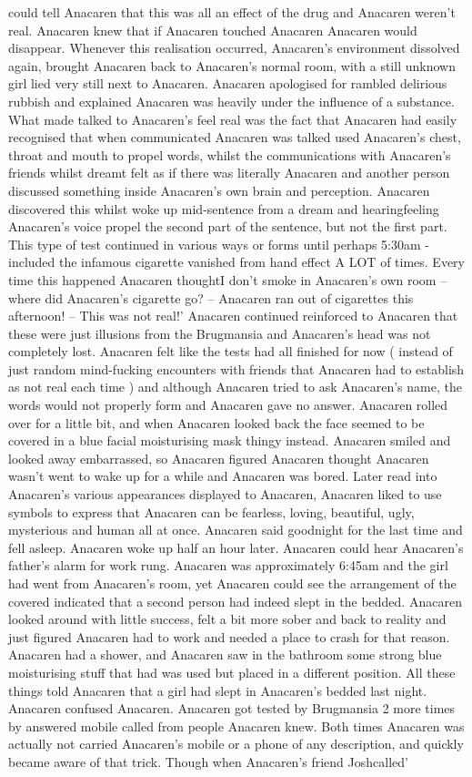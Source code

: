 \documentclass[12pt]{book}
\begin{document}
could tell Anacaren that this was all an effect of the drug and Anacaren weren't real. Anacaren knew that if Anacaren touched Anacaren Anacaren would disappear. Whenever this realisation occurred, Anacaren's environment dissolved again, brought Anacaren back to Anacaren's normal room, with a still unknown girl lied very still next to Anacaren. Anacaren apologised for rambled delirious rubbish and explained Anacaren was heavily under the influence of a substance. What made talked to Anacaren's feel real was the fact that Anacaren had easily recognised that when communicated Anacaren was talked used Anacaren's chest, throat and mouth to propel words, whilst the communications with Anacaren's friends whilst dreamt felt as if there was literally Anacaren and another person discussed something inside Anacaren's own brain and perception. Anacaren discovered this whilst woke up mid-sentence from a dream and hearingfeeling Anacaren's voice propel the second part of the sentence, but not the first part. This type of test continued in various ways or forms until perhaps 5:30am - included the infamous cigarette vanished from hand effect A LOT of times. Every time this happened Anacaren thoughtI don't smoke in Anacaren's own room -- where did Anacaren's cigarette go? -- Anacaren ran out of cigarettes this afternoon! -- This was not real!' Anacaren continued reinforced to Anacaren that these were just illusions from the Brugmansia and Anacaren's head was not completely lost. Anacaren felt like the tests had all finished for now ( instead of just random mind-fucking encounters with friends that Anacaren had to establish as not real each time ) and although Anacaren tried to ask Anacaren's name, the words would not properly form and Anacaren gave no answer. Anacaren rolled over for a little bit, and when Anacaren looked back the face seemed to be covered in a blue facial moisturising mask thingy instead. Anacaren smiled and looked away embarrassed, so Anacaren figured Anacaren thought Anacaren wasn't went to wake up for a while and Anacaren was bored. Later read into Anacaren's various appearances displayed to Anacaren, Anacaren liked to use symbols to express that Anacaren can be fearless, loving, beautiful, ugly, mysterious and human all at once. Anacaren said goodnight for the last time and fell asleep. Anacaren woke up half an hour later. Anacaren could hear Anacaren's father's alarm for work rung. Anacaren was approximately 6:45am and the girl had went from Anacaren's room, yet Anacaren could see the arrangement of the covered indicated that a second person had indeed slept in the bedded. Anacaren looked around with little success, felt a bit more sober and back to reality and just figured Anacaren had to work and needed a place to crash for that reason. Anacaren had a shower, and Anacaren saw in the bathroom some strong blue moisturising stuff that had was used but placed in a different position. All these things told Anacaren that a girl had slept in Anacaren's bedded last night. Anacaren confused Anacaren. Anacaren got tested by Brugmansia 2 more times by answered mobile called from people Anacaren knew. Both times Anacaren was actually not carried Anacaren's mobile or a phone of any description, and quickly became aware of that trick. Though when Anacaren's friend Joshcalled' 
\end{document}
